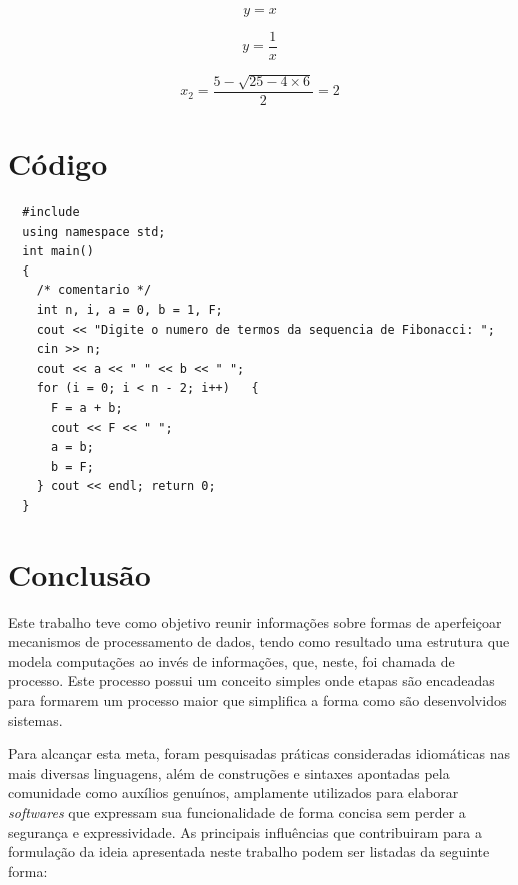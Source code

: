 \documentclass[12pt]{article}
\begin{document}
  \begin{equation}
  y = x
  \end{equation}

  \begin{equation}
  y = \frac{1}{x}
  \end{equation}

  \begin{equation}
  x_2 = \frac{5 - \sqrt{25 - 4 \times 6}}{2} = 2
  \end{equation}


  \section{Código}

  \begin{lstlisting}
  #include 
  using namespace std;
  int main()
  {
    /* comentario */
    int n, i, a = 0, b = 1, F;
    cout << "Digite o numero de termos da sequencia de Fibonacci: ";
    cin >> n;
    cout << a << " " << b << " ";
    for (i = 0; i < n - 2; i++)   {
      F = a + b;
      cout << F << " ";
      a = b;
      b = F;
    } cout << endl; return 0;
  } \end{lstlisting}

  \section{Conclusão}
  
  Este trabalho teve como objetivo reunir informações sobre formas de aperfeiçoar mecanismos de processamento de dados, tendo como resultado uma estrutura que modela computações ao invés de informações, que, neste, foi chamada de processo. Este processo possui um conceito simples onde etapas são encadeadas para formarem um processo maior que simplifica a forma como são desenvolvidos sistemas.
  
  Para alcançar esta meta, foram pesquisadas práticas consideradas idiomáticas nas mais diversas linguagens, além de construções e sintaxes apontadas pela comunidade como auxílios genuínos, amplamente utilizados para elaborar \textit{softwares} que expressam sua funcionalidade de forma concisa sem perder a segurança e expressividade. As principais influências que contribuiram para a formulação da ideia apresentada neste trabalho podem ser listadas da seguinte forma:
  
\end{document}
